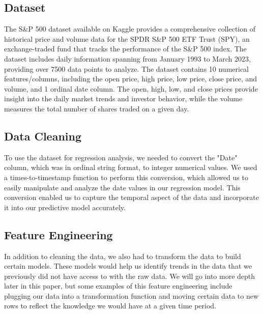 \documentclass[final,5p,times,twocolumn,authoryear, 12pt]{elsarticle}
\begin{document}
\subsection{Dataset}

The S\&P 500 dataset available on Kaggle provides a comprehensive collection of historical price and volume data for the SPDR S\&P 500 ETF Trust (SPY), an exchange-traded fund that tracks the performance of the S\&P 500 index. The dataset includes daily information spanning from January 1993 to March 2023, providing over 7500 data points to analyze.
The dataset contains 10 numerical features/columns, including the open price, high price, low price, close price, and volume, and 1 ordinal date column. The open, high, low, and close prices provide insight into the daily market trends and investor behavior, while the volume measures the total number of shares traded on a given day.

\subsection{Data Cleaning}

To use the dataset for regression analysis, we needed to convert the "Date" column, which was in ordinal string format, to integer numerical values. We used a times-to-timestamp function to perform this conversion, which allowed us to easily manipulate and analyze the date values in our regression model. This conversion enabled us to capture the temporal aspect of the data and incorporate it into our predictive model accurately.

\subsection{Feature Engineering}

In addition to cleaning the data, we also had to transform the data to build certain models. These models would help us identify trends in the data that we previously did not have access to with the raw data. We will go into more depth later in this paper, but some examples of this feature engineering include plugging our data into a transformation function and moving certain data to new rows to reflect the knowledge we would have at a given time period.


\end{document}
